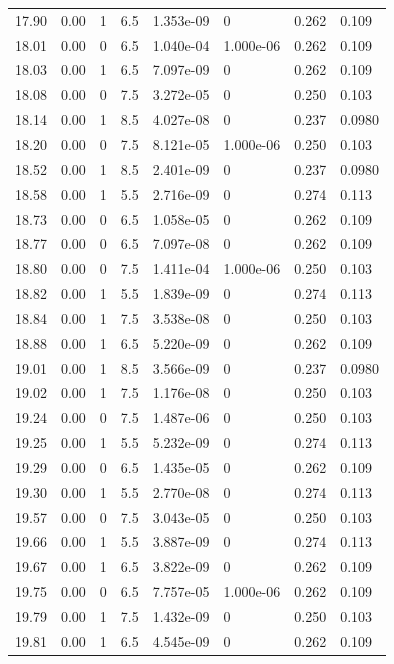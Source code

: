 \documentclass[preview]{standalone}
\begin{document}
{{{{{{\begin{tabular}{L{1.2cm}C{1.2cm} C{0.3cm}C{0.5cm} C{1.4cm}C{1.4cm} C{1.4cm}C{1.4cm}}
  17.90  &  0.00  & 1     & 6.5 &  1.353e-09  & 0  & 0.262 &  0.109   \\ 
  18.01  &  0.00  & 0     & 6.5 &  1.040e-04  & 1.000e-06  & 0.262 &  0.109   \\ 
  18.03  &  0.00  & 1     & 6.5 &  7.097e-09  & 0  & 0.262 &  0.109   \\ 
  18.08  &  0.00  & 0     & 7.5 &  3.272e-05  & 0  & 0.250 &  0.103   \\ 
  18.14  &  0.00  & 1     & 8.5 &  4.027e-08  & 0  & 0.237 &  0.0980   \\ 
  18.20  &  0.00  & 0     & 7.5 &  8.121e-05  & 1.000e-06  & 0.250 &  0.103   \\ 
  18.52  &  0.00  & 1     & 8.5 &  2.401e-09  & 0  & 0.237 &  0.0980   \\ 
  18.58  &  0.00  & 1     & 5.5 &  2.716e-09  & 0  & 0.274 &  0.113   \\ 
  18.73  &  0.00  & 0     & 6.5 &  1.058e-05  & 0  & 0.262 &  0.109   \\ 
  18.77  &  0.00  & 0     & 6.5 &  7.097e-08  & 0  & 0.262 &  0.109   \\ 
  18.80  &  0.00  & 0     & 7.5 &  1.411e-04  & 1.000e-06  & 0.250 &  0.103   \\ 
  18.82  &  0.00  & 1     & 5.5 &  1.839e-09  & 0  & 0.274 &  0.113   \\ 
  18.84  &  0.00  & 1     & 7.5 &  3.538e-08  & 0  & 0.250 &  0.103   \\ 
  18.88  &  0.00  & 1     & 6.5 &  5.220e-09  & 0  & 0.262 &  0.109   \\ 
  19.01  &  0.00  & 1     & 8.5 &  3.566e-09  & 0  & 0.237 &  0.0980   \\ 
  19.02  &  0.00  & 1     & 7.5 &  1.176e-08  & 0  & 0.250 &  0.103   \\ 
  19.24  &  0.00  & 0     & 7.5 &  1.487e-06  & 0  & 0.250 &  0.103   \\ 
  19.25  &  0.00  & 1     & 5.5 &  5.232e-09  & 0  & 0.274 &  0.113   \\ 
  19.29  &  0.00  & 0     & 6.5 &  1.435e-05  & 0  & 0.262 &  0.109   \\ 
  19.30  &  0.00  & 1     & 5.5 &  2.770e-08  & 0  & 0.274 &  0.113   \\ 
  19.57  &  0.00  & 0     & 7.5 &  3.043e-05  & 0  & 0.250 &  0.103   \\ 
  19.66  &  0.00  & 1     & 5.5 &  3.887e-09  & 0  & 0.274 &  0.113   \\ 
  19.67  &  0.00  & 1     & 6.5 &  3.822e-09  & 0  & 0.262 &  0.109   \\ 
  19.75  &  0.00  & 0     & 6.5 &  7.757e-05  & 1.000e-06  & 0.262 &  0.109   \\ 
  19.79  &  0.00  & 1     & 7.5 &  1.432e-09  & 0  & 0.250 &  0.103   \\ 
  19.81  &  0.00  & 1     & 6.5 &  4.545e-09  & 0  & 0.262 &  0.109   \\ 
\hline 
\end{tabular} 

}}}}}}
\end{document}
